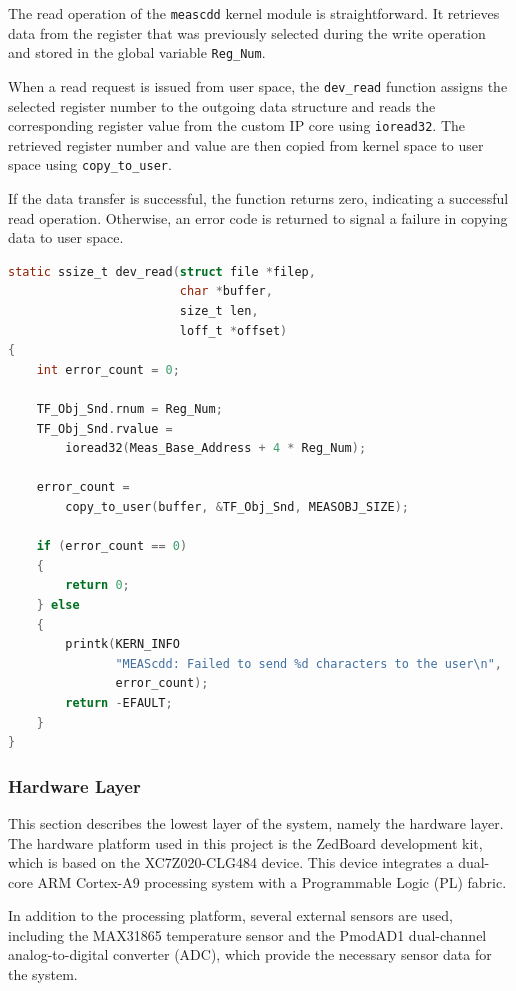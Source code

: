 \documentclass{article}
\begin{document}
The read operation of the \texttt{meascdd} kernel module is straightforward. It 
retrieves data from the register that was previously selected during the write 
operation and stored in the global variable \texttt{Reg\_Num}.

When a read request is issued from user space, the \texttt{dev\_read} function 
assigns the selected register number to the outgoing data structure and reads 
the corresponding register value from the custom IP core using \texttt{ioread32}. 
The retrieved register number and value are then copied from kernel space to 
user space using \texttt{copy\_to\_user}.

If the data transfer is successful, the function returns zero, indicating a 
successful read operation. Otherwise, an error code is returned to signal a 
failure in copying data to user space.

\begin{lstlisting}[language=C,
caption={Read operation implementation of the meascdd kernel module},
label={lst:meascdd_read}]
static ssize_t dev_read(struct file *filep,
                        char *buffer,
                        size_t len,
                        loff_t *offset)
{
    int error_count = 0;

    TF_Obj_Snd.rnum = Reg_Num;
    TF_Obj_Snd.rvalue =
        ioread32(Meas_Base_Address + 4 * Reg_Num);

    error_count =
        copy_to_user(buffer, &TF_Obj_Snd, MEASOBJ_SIZE);

    if (error_count == 0) 
    {
        return 0;
    } else 
    {
        printk(KERN_INFO
               "MEAScdd: Failed to send %d characters to the user\n",
               error_count);
        return -EFAULT;
    }
}
\end{lstlisting}




\subsubsection{Hardware Layer}
This section describes the lowest layer of the system, namely the hardware layer. 
The hardware platform used in this project is the ZedBoard development kit, which is
based on the XC7Z020-CLG484 device. This device integrates a dual-core ARM Cortex-A9 
processing system with a Programmable Logic (PL) fabric.

In addition to the processing platform, several external sensors are used, including 
the MAX31865 temperature sensor and the PmodAD1 dual-channel analog-to-digital 
converter (ADC), which provide the necessary sensor data for the system.
\end{document}
